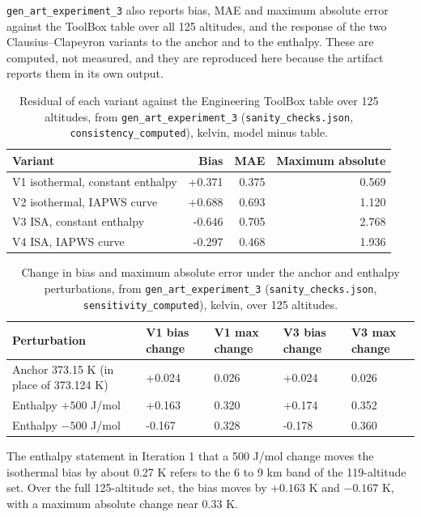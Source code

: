 \documentclass[11pt,letterpaper]{article}
\begin{document}
\texttt{gen\_art\_experiment\_3} also reports bias, MAE and maximum absolute error against the ToolBox table over all 125 altitudes, and the response of the two Clausius--Clapeyron variants to the anchor and to the enthalpy. These are computed, not measured, and they are reproduced here because the artifact reports them in its own output.

\begin{table}[!htbp]
\centering\small
\caption{Residual of each variant against the Engineering ToolBox table over 125 altitudes, from \texttt{gen\_art\_experiment\_3} (\texttt{sanity\_checks.json}, \texttt{consistency\_computed}), kelvin, model minus table.}\label{tab:exp3tb}
\begin{tabular}{lrrr}
\toprule
Variant & Bias & MAE & Maximum absolute \\
\midrule
V1 isothermal, constant enthalpy & +0.371 & 0.375 & 0.569 \\
V2 isothermal, IAPWS curve & +0.688 & 0.693 & 1.120 \\
V3 ISA, constant enthalpy & -0.646 & 0.705 & 2.768 \\
V4 ISA, IAPWS curve & -0.297 & 0.468 & 1.936 \\
\bottomrule
\end{tabular}
\end{table}

\begin{table}[!htbp]
\centering\small
\caption{Change in bias and maximum absolute error under the anchor and enthalpy perturbations, from \texttt{gen\_art\_experiment\_3} (\texttt{sanity\_checks.json}, \texttt{sensitivity\_computed}), kelvin, over 125 altitudes.}\label{tab:exp3sens}
\begin{tabular}{p{4.6cm}p{2.6cm}p{2.6cm}p{2.6cm}p{2.6cm}}
\toprule
Perturbation & V1 bias change & V1 max change & V3 bias change & V3 max change \\
\midrule
Anchor 373.15 K (in place of 373.124 K) & +0.024 & 0.026 & +0.024 & 0.026 \\
Enthalpy $+500$ J/mol & +0.163 & 0.320 & +0.174 & 0.352 \\
Enthalpy $-500$ J/mol & -0.167 & 0.328 & -0.178 & 0.360 \\
\bottomrule
\end{tabular}
\end{table}

The enthalpy statement in Iteration 1 that a 500 J/mol change moves the isothermal bias by about 0.27 K refers to the 6 to 9 km band of the 119-altitude set. Over the full 125-altitude set, the bias moves by $+0.163$ K and $-0.167$ K, with a maximum absolute change near 0.33 K.
\end{document}
